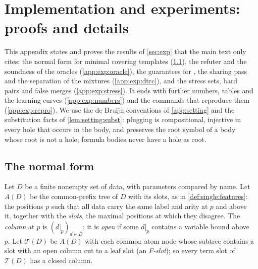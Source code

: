 \section{Implementation and experiments: proofs and details}\label{app:exp}

This appendix states and proves the results of \cref{sec:exp} that the main text only cites: the normal form for minimal covering templates (\cref{app:exp:normal}), the refuter and the soundness of the oracles (\cref{app:exp:oracle}), the guarantees for \DTRC{}, the sharing pass and the separation of the mixtures (\cref{app:exp:dtrc}), and the stress sets, hard pairs and false merges (\cref{app:exp:stress}). It ends with further numbers, tables and the learning curves (\cref{app:exp:numbers}) and the commands that reproduce them (\cref{app:exp:repro}). We use the de Bruijn conventions of \cref{app:setting} and the substitution facts of \cref{lem:setting:subst}: plugging is compositional, injective in every hole that occurs in the body, and preserves the root symbol of a body whose root is not a hole; formula bodies never have a hole as root.

\subsection{The normal form}\label{app:exp:normal}

Let $D$ be a finite nonempty set of data, with parameters compared by name. Let $A(D)$ be the common-prefix tree of $D$ with its slots, as in \cref{def:single:features}: the positions $p$ such that all data carry the same label and arity at $p$ and above it, together with the \emph{slots}, the maximal positions at which they disagree. The \emph{column} at $p$ is $(d|_p)_{d\in D}$; it is \emph{open} if some $d|_p$ contains a variable bound above $p$. Let $\mathcal T(D)$ be $A(D)$ with each common atom node whose subtree contains a slot with an open column cut to a leaf slot (an \emph{F-slot}); so every term slot of $\mathcal T(D)$ has a closed column.

